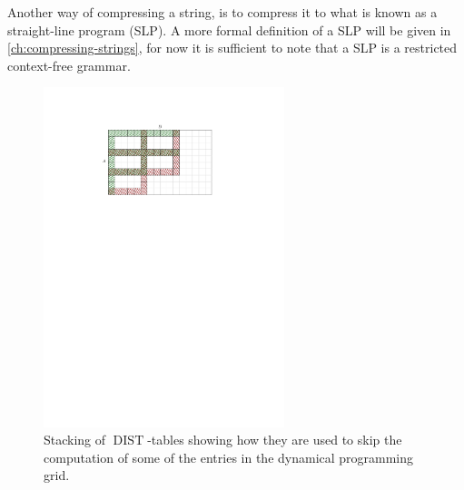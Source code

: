 \documentclass[twoside,11pt,openright]{report}
\newcommand{\DIST}{\operatorname{DIST}}
\begin{document}
Another way of compressing a string, is to compress it to what is known as a straight-line program (SLP). A more formal definition of a SLP will be given in \cref{ch:compressing-strings}, for now it is sufficient to note that a SLP is a restricted context-free grammar.

\begin{figure}
  \centering
  \includegraphics[width=7cm]{images/grid-dist-2}
  \caption{Stacking of $\DIST$-tables showing how they are used to skip the computation of some of the entries in the dynamical programming grid.}
  \label{fig:intro:dist-tables}
\end{figure}
\end{document}

